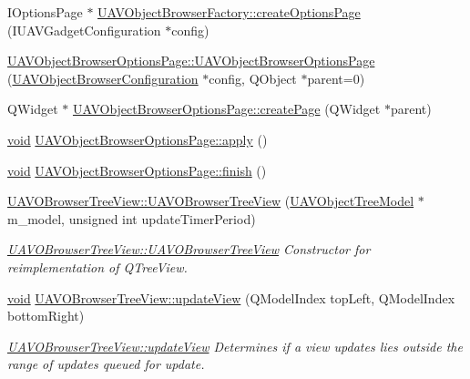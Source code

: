 \begin{DoxyCompactItemize}
\item 
\-I\-Options\-Page $\ast$ \hyperlink{group___u_a_v_object_browser_plugin_ga196f1eda8a78dac2c94fb6fe3f6a563d}{\-U\-A\-V\-Object\-Browser\-Factory\-::create\-Options\-Page} (\-I\-U\-A\-V\-Gadget\-Configuration $\ast$config)
\item 
\hyperlink{group___u_a_v_object_browser_plugin_gae101cd8e551d717a5421361feafa1cf0}{\-U\-A\-V\-Object\-Browser\-Options\-Page\-::\-U\-A\-V\-Object\-Browser\-Options\-Page} (\hyperlink{class_u_a_v_object_browser_configuration}{\-U\-A\-V\-Object\-Browser\-Configuration} $\ast$config, \-Q\-Object $\ast$parent=0)
\item 
\-Q\-Widget $\ast$ \hyperlink{group___u_a_v_object_browser_plugin_gae567a8d4a9212e69b15f4cdb06c7ac09}{\-U\-A\-V\-Object\-Browser\-Options\-Page\-::create\-Page} (\-Q\-Widget $\ast$parent)
\item 
\hyperlink{group___u_a_v_objects_plugin_ga444cf2ff3f0ecbe028adce838d373f5c}{void} \hyperlink{group___u_a_v_object_browser_plugin_ga13631605b54e41a066fa4f4d2472b072}{\-U\-A\-V\-Object\-Browser\-Options\-Page\-::apply} ()
\item 
\hyperlink{group___u_a_v_objects_plugin_ga444cf2ff3f0ecbe028adce838d373f5c}{void} \hyperlink{group___u_a_v_object_browser_plugin_gabd2876750567bb091c8c009d2cca931f}{\-U\-A\-V\-Object\-Browser\-Options\-Page\-::finish} ()
\item 
\hyperlink{group___u_a_v_object_browser_plugin_gac8e16cfc29870fb1f96574c5e0a99f13}{\-U\-A\-V\-O\-Browser\-Tree\-View\-::\-U\-A\-V\-O\-Browser\-Tree\-View} (\hyperlink{class_u_a_v_object_tree_model}{\-U\-A\-V\-Object\-Tree\-Model} $\ast$m\-\_\-model, unsigned int update\-Timer\-Period)
\begin{DoxyCompactList}\small\item\em \hyperlink{group___u_a_v_object_browser_plugin_gac8e16cfc29870fb1f96574c5e0a99f13}{\-U\-A\-V\-O\-Browser\-Tree\-View\-::\-U\-A\-V\-O\-Browser\-Tree\-View} \-Constructor for reimplementation of \-Q\-Tree\-View. \end{DoxyCompactList}\item 
\hyperlink{group___u_a_v_objects_plugin_ga444cf2ff3f0ecbe028adce838d373f5c}{void} \hyperlink{group___u_a_v_object_browser_plugin_ga39a127a4af34e1ea92aca8448ee5e92f}{\-U\-A\-V\-O\-Browser\-Tree\-View\-::update\-View} (\-Q\-Model\-Index top\-Left, \-Q\-Model\-Index bottom\-Right)
\begin{DoxyCompactList}\small\item\em \hyperlink{group___u_a_v_object_browser_plugin_ga39a127a4af34e1ea92aca8448ee5e92f}{\-U\-A\-V\-O\-Browser\-Tree\-View\-::update\-View} \-Determines if a view updates lies outside the range of updates queued for update. \end{DoxyCompactList}\item 

\end{DoxyCompactItemize}
